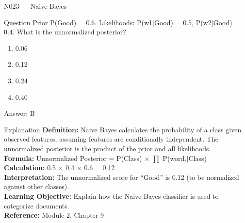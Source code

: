 \documentclass[aspectratio=169,8pt]{beamer}
\begin{document}
	\begin{frame}{N023 --- Naive Bayes}
		\begin{block}{Question}
			Prior P(Good) = 0.6. Likelihoods: P(w1$|$Good) = 0.5, P(w2$|$Good) = 0.4. What is the unnormalized posterior?
			\begin{enumerate}
				\item 0.06
				\item 0.12
				\item 0.24
				\item 0.40
			\end{enumerate}
		\end{block}
		\begin{exampleblock}{Answer: B}\end{exampleblock}
		\begin{block}{Explanation}
			\textbf{Definition:} Naive Bayes calculates the probability of a class given observed features, assuming features are conditionally independent. The unnormalized posterior is the product of the prior and all likelihoods.\\
			\textbf{Formula:} Unnormalized Posterior = P(Class) $\times$ $\prod$ P(word$_{i}$$|$Class)\\
			\textbf{Calculation:} 0.5 $\times$ 0.4 $\times$ 0.6 = 0.12\\
			\textbf{Interpretation:} The unnormalized score for ``Good'' is 0.12 (to be normalized against other classes).\\
			\textbf{Learning Objective:} Explain how the Naive Bayes classifier is used to categorize documents.\\
			\textbf{Reference:} Module 2, Chapter 9
		\end{block}
	\end{frame}
	
\end{document}
